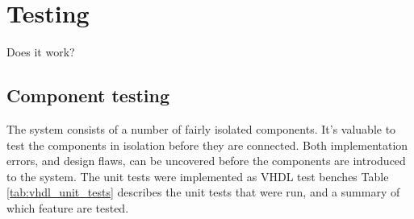\documentclass[../main/report.tex]{subfiles}
\begin{document}
\chapter{Testing}

Does it work?


\section{Component testing}
The system consists of a number of fairly isolated components.
It's valuable to test the components in isolation before they are connected.
Both implementation errors, and design flaws, can be uncovered before the components are introduced to the system.
The unit tests were implemented as VHDL test benches
Table \ref{tab:vhdl_unit_tests} describes the unit tests that were run, and a summary of which feature are tested.
\end{document}
